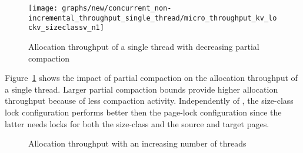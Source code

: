 \documentclass{amsart}
\begin{document}
\begin{figure}
\begin{center}
\texttt{[image: graphs/new/concurrent\_non-incremental\_throughput\_single\_thread/micro\_throughput\_kv\_lockv\_sizeclassv\_n1]}
\caption{Allocation throughput of a single thread with decreasing partial compaction}
\label{fig:exp-partial}
\end{center}
\end{figure}

Figure~\ref{fig:exp-partial} shows the impact of partial compaction on
the allocation throughput of a single thread.  Larger partial
compaction bounds  provide higher allocation throughput
because of less compaction activity.  Independently of , the
size-class lock configuration performs better then the page-lock
configuration since the latter needs locks for both the size-class
and the source and target pages.

\begin{figure*}
\begin{center}
\caption{Allocation throughput with an increasing number of threads}
\label{fig:exp-scale}
\end{center}
\end{figure*}
\end{document}
